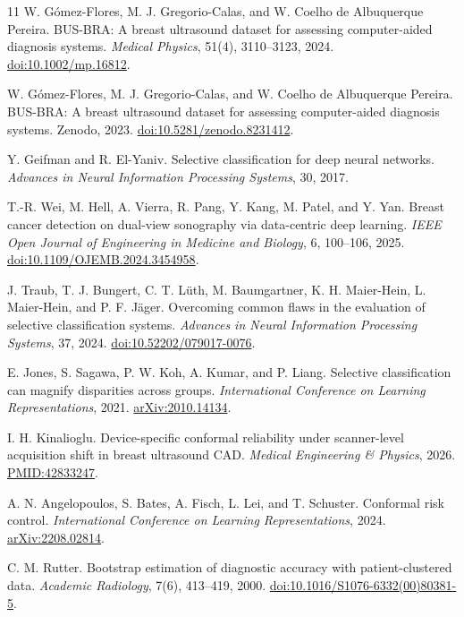 \documentclass[11pt]{article}
\begin{document}
\begin{thebibliography}{11}
W. G\'omez-Flores, M. J. Gregorio-Calas, and W. Coelho de Albuquerque Pereira.
BUS-BRA: A breast ultrasound dataset for assessing computer-aided diagnosis systems.
\emph{Medical Physics}, 51(4), 3110--3123, 2024.
\href{https://doi.org/10.1002/mp.16812}{doi:10.1002/mp.16812}.

W. G\'omez-Flores, M. J. Gregorio-Calas, and W. Coelho de Albuquerque Pereira.
BUS-BRA: A breast ultrasound dataset for assessing computer-aided diagnosis systems.
Zenodo, 2023. \href{https://doi.org/10.5281/zenodo.8231412}{doi:10.5281/zenodo.8231412}.

Y. Geifman and R. El-Yaniv.
Selective classification for deep neural networks.
\emph{Advances in Neural Information Processing Systems}, 30, 2017.

T.-R. Wei, M. Hell, A. Vierra, R. Pang, Y. Kang, M. Patel, and Y. Yan.
Breast cancer detection on dual-view sonography via data-centric deep learning.
\emph{IEEE Open Journal of Engineering in Medicine and Biology}, 6, 100--106, 2025.
\href{https://doi.org/10.1109/OJEMB.2024.3454958}{doi:10.1109/OJEMB.2024.3454958}.

J. Traub, T. J. Bungert, C. T. L\"uth, M. Baumgartner, K. H. Maier-Hein,
L. Maier-Hein, and P. F. J\"ager.
Overcoming common flaws in the evaluation of selective classification systems.
\emph{Advances in Neural Information Processing Systems}, 37, 2024.
\href{https://doi.org/10.52202/079017-0076}{doi:10.52202/079017-0076}.

E. Jones, S. Sagawa, P. W. Koh, A. Kumar, and P. Liang.
Selective classification can magnify disparities across groups.
\emph{International Conference on Learning Representations}, 2021.
\href{https://arxiv.org/abs/2010.14134}{arXiv:2010.14134}.

I. H. Kinalioglu.
Device-specific conformal reliability under scanner-level acquisition shift in breast ultrasound CAD.
\emph{Medical Engineering \& Physics}, 2026.
\href{https://pubmed.ncbi.nlm.nih.gov/42833247/}{PMID:42833247}.

A. N. Angelopoulos, S. Bates, A. Fisch, L. Lei, and T. Schuster.
Conformal risk control.
\emph{International Conference on Learning Representations}, 2024.
\href{https://arxiv.org/abs/2208.02814}{arXiv:2208.02814}.

C. M. Rutter.
Bootstrap estimation of diagnostic accuracy with patient-clustered data.
\emph{Academic Radiology}, 7(6), 413--419, 2000.
\href{https://doi.org/10.1016/S1076-6332(00)80381-5}{doi:10.1016/S1076-6332(00)80381-5}.


\end{thebibliography}
\end{document}
